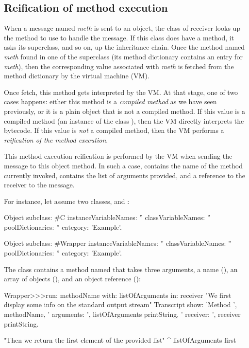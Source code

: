 \documentclass[a4paper,10pt,twoside]{book}
\begin{document}
\subsection{Reification of method execution}

When a message named \emph{meth} is sent to an object, the class of receiver looks up the method to use to handle the message. If this class does have a method, it asks its superclass, and so on, up the inheritance chain. Once the method named \emph{meth} found in one of the superclass (\ie its method dictionary contains an entry for \emph{meth}), then the corresponding value associated with \emph{meth} is fetched from the method dictionary by the virtual machine (VM).

Once fetch, this method gets interpreted by the VM. At that stage, one of two cases happens: either this method is a \emph{compiled method} as we have seen previously, or it is a plain object that is not a compiled method. If this value is a compiled method (an instance of the class ), then the VM directly interprets the bytecode. If this value is \emph{not} a compiled method, then the VM performs a \emph{reification of the method execution}.

This method execution reification is performed by the VM when sending the message  to this object method. In such a case,  contains the name of the method currently invoked,  contains the list of arguments provided, and  a reference to the receiver to the message.

For instance, let assume two classes,  and :

\begin{code}{}
Object subclass: #C
	instanceVariableNames: ''
	classVariableNames: ''
	poolDictionaries: ''
	category: 'Example'.
 
Object subclass: #Wrapper
	instanceVariableNames: ''
	classVariableNames: ''
	poolDictionaries: ''
	category: 'Example'.
\end{code}

The class  contains a method named  that takes three arguments, a name (), an array of objects (), and an object reference ():

\begin{code}{}
Wrapper>>>run: methodName with: listOfArguments in: receiver
	"We first display some info on the standard output stream"
	Transcript show: 'Method ', methodName,
		' arguments: ', listOfArguments printString,
		' receiver: ', receiver printString.

	"Then we return the first element of the provided list"
	^ listOfArguments first
\end{code}
\end{document}
